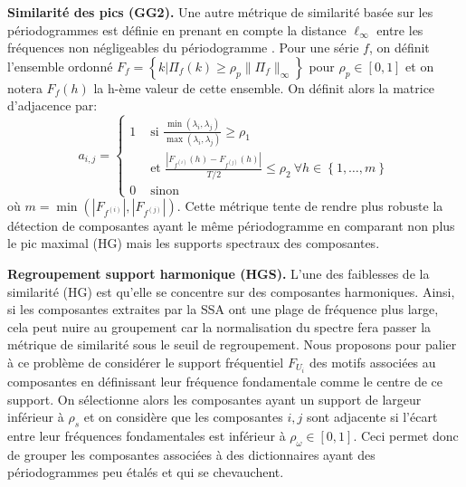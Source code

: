 \documentclass{gretsi}
\newcommand{\set}[1]{\left \{ 1, \dots, #1 \right \}}
\newcommand{\inter}{\left[0, 1\right]}
\begin{document}
\textbf{Similarité des pics (GG2).}\label{par:GG2}
    Une autre métrique de similarité basée sur les périodogrammes est définie en prenant en compte la distance $\ell_\infty$ entre les fréquences non négligeables du périodogramme \cite{abalov_14_auto}.
    Pour une série $f$, on définit l'ensemble ordonné $F_f = \left \{ k | \Pi_f(k) \ge \rho_p \|\Pi_f\|_\infty \right \}$ pour $\rho_p \in \inter$ et on notera $F_f(h)$ la h-ème valeur de cette ensemble.
    On définit alors la matrice d'adjacence par:
    \begin{equation}
        a_{i, j} = 
        \begin{cases}
	        1 & \text{ si } \displaystyle\frac{\min(\lambda_i, \lambda_j)}{\max(\lambda_i, \lambda_j)} \ge \rho_1\\
	          & \text{ et } \frac{|F_{f^{(i)}}(h) - F_{f^{(j)}}(h)|}{T/2} \le \rho_2\ \forall h \in \set{m}\\
	        0 & \text{ sinon}
        \end{cases}
    \end{equation} 
    où $m = \min\left(\left|F_{f^{(i)}}\right|, \left|F_{f^{(j)}}\right|\right)$.
    Cette métrique tente de rendre plus robuste la détection de composantes ayant le même périodogramme en comparant non plus le pic maximal (HG) mais les supports spectraux des composantes. 


\textbf{Regroupement support harmonique (HGS).}\label{par:HGS}
    L'une des faiblesses de la similarité (HG) est qu'elle se concentre sur des composantes harmoniques. 
    Ainsi, si les composantes extraites par la SSA ont une plage de fréquence plus large, cela peut nuire au groupement car la normalisation du spectre fera passer la métrique de similarité sous le seuil de regroupement.
    Nous proposons pour palier à ce problème de considérer le support fréquentiel $F_{U_i}$ des motifs associées au composantes en définissant leur fréquence fondamentale comme le centre de ce support.
    On sélectionne alors les composantes ayant un support de largeur inférieur à $\rho_s$ et on considère que les composantes $i, j$ sont adjacente si l'écart entre leur fréquences fondamentales est inférieur à $\rho_\omega \in \inter$.
    Ceci permet donc de grouper les composantes associées à des dictionnaires ayant des périodogrammes peu étalés et qui se chevauchent.
\end{document}
